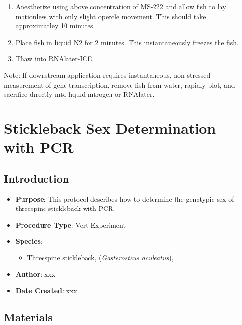 \documentclass[
  letterpaper,
  DIV=11,
  numbers=noendperiod]{scrreprt}
\providecommand{\tightlist}{%
  \setlength{\itemsep}{0pt}\setlength{\parskip}{0pt}}\usepackage{longtable,booktabs,array}
\begin{document}
\begin{enumerate}
\def\labelenumi{\arabic{enumi}.}
\tightlist
\item
  Anesthetize using above concentration of MS-222 and allow fish to lay
  motionless with only slight opercle movement. This should take
  approximatley 10 minutes.
\item
  Place fish in liquid N2 for 2 minutes. This instantaneously freezes
  the fish.
\item
  Thaw into RNAlater-ICE.
\end{enumerate}

Note: If downstream application requires instantaneous, non stressed
measurement of gene transcription, remove fish from water, rapidly blot,
and sacrifice directly into liquid nitrogen or RNAlater.

\hypertarget{sec-vert_exp-SB_sex_PCR}{%
\chapter{Stickleback Sex Determination with
PCR}\label{sec-vert_exp-SB_sex_PCR}}

\hypertarget{introduction-83}{%
\section{Introduction}\label{introduction-83}}

\begin{itemize}
\tightlist
\item
  \textbf{Purpose}: This protocol describes how to determine the
  genotypic sex of threespine stickleback with PCR.
\item
  \textbf{Procedure Type}: Vert Experiment
\item
  \textbf{Species}:

  \begin{itemize}
  \tightlist
  \item
    Threespine stickleback, (\emph{Gasterosteus aculeatus}),
  \end{itemize}
\item
  \textbf{Author}: xxx
\item
  \textbf{Date Created}: xxx
\end{itemize}

\hypertarget{materials-79}{%
\section{Materials}\label{materials-79}}
\end{document}
